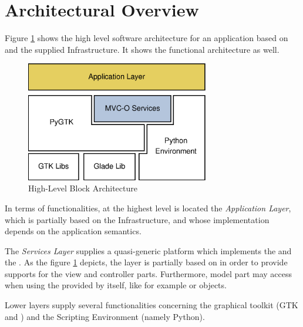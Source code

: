 \section{\label{ARCH} Architectural Overview}

Figure \ref{HLA_f} shows the high level software architecture for an
application based on \pygtk and the supplied \mvco Infrastructure.  It
shows the functional architecture as well.

\begin{figure}[htbp]
\begin{center}
\includegraphics[width=8cm]{eps/arch.eps}
\caption{\label{HLA_f}High-Level Block Architecture}
\end{center}
\end{figure}

In terms of functionalities, at the highest level is located the
\emph{Application Layer}, which is partially based on the \mvco
Infrastructure, and whose implementation depends on the application
semantics.

The \emph{\mvco Services Layer} supplies a quasi-generic platform
which implements the \mvc and the \obs. As the figure \ref{HLA_f}
depicts, the \mvco layer is partially based on \pygtk in order to
provide supports for the view and controller parts. Furthermore, model
part may access \pygtk when using the \mvc provided by \pygtk itself,
like for example  or 
objects.

Lower layers supply several functionalities concerning the graphical
toolkit (GTK and \glade) and the Scripting Environment (namely
Python).



